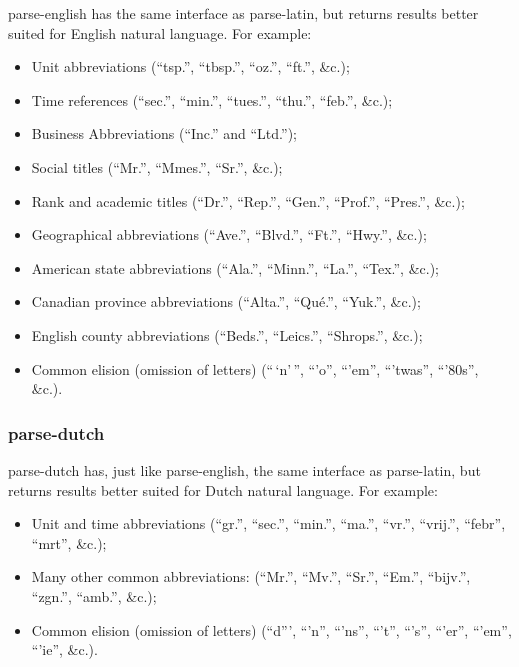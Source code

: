 parse-english has the same interface as parse-latin, but returns results
better suited for English natural language. For example:

\begin{itemize}
\itemsep1pt\parskip0pt
\item
  Unit abbreviations (``tsp.'', ``tbsp.'', ``oz.'', ``ft.'', \&c.);
\item
  Time references (``sec.'', ``min.'', ``tues.'', ``thu.'', ``feb.'',
  \&c.);
\item
  Business Abbreviations (``Inc.'' and ``Ltd.'');
\item
  Social titles (``Mr.'', ``Mmes.'', ``Sr.'', \&c.);
\item
  Rank and academic titles (``Dr.'', ``Rep.'', ``Gen.'', ``Prof.'',
  ``Pres.'', \&c.);
\item
  Geographical abbreviations (``Ave.'', ``Blvd.'', ``Ft.'', ``Hwy.'',
  \&c.);
\item
  American state abbreviations (``Ala.'', ``Minn.'', ``La.'', ``Tex.'',
  \&c.);
\item
  Canadian province abbreviations (``Alta.'', ``Qué.'', ``Yuk.'', \&c.);
\item
  English county abbreviations (``Beds.'', ``Leics.'', ``Shrops.'',
  \&c.);
\item
  Common elision (omission of letters) (``\,`n'\,'', ``'o'', ``'em'',
  ``'twas'', ``'80s'', \&c.).
\end{itemize}

\subsubsection{parse-dutch}\label{parse-dutch}

parse-dutch has, just like parse-english, the same interface as
parse-latin, but returns results better suited for Dutch natural
language. For example:

\begin{itemize}
\itemsep1pt\parskip0pt
\item
  Unit and time abbreviations (``gr.'', ``sec.'', ``min.'', ``ma.'',
  ``vr.'', ``vrij.'', ``febr'', ``mrt'', \&c.);
\item
  Many other common abbreviations: (``Mr.'', ``Mv.'', ``Sr.'', ``Em.'',
  ``bijv.'', ``zgn.'', ``amb.'', \&c.);
\item
  Common elision (omission of letters) (``d''', ``'n'', ``'ns'', ``'t'',
  ``'s'', ``'er'', ``'em'', ``'ie'', \&c.).
\end{itemize}

